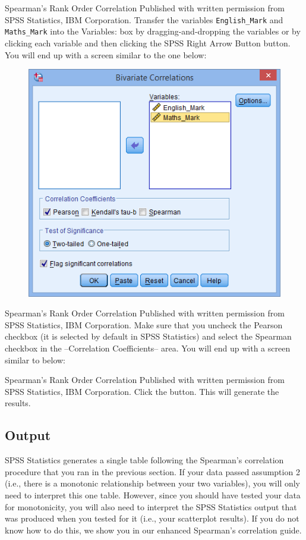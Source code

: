 \documentclass[]{article}
\begin{document}
Spearman's Rank Order Correlation
Published with written permission from SPSS Statistics, IBM Corporation.
Transfer the variables \texttt{English\_Mark} and \texttt{Maths\_Mark} into the Variables: box by dragging-and-dropping the variables or by clicking each variable and then clicking the SPSS Right Arrow Button button. You will end up with a screen similar to the one below:
\begin{figure}
	\centering
	\includegraphics[width=0.7\linewidth]{images/spearmans-rank-order-correlation-3}
	\caption{}
	\label{fig:spearmans-rank-order-correlation-3}
\end{figure}
Spearman's Rank Order Correlation
Published with written permission from SPSS Statistics, IBM Corporation.
Make sure that you uncheck the Pearson checkbox (it is selected by default in SPSS Statistics) and select the Spearman checkbox in the –Correlation Coefficients– area. You will end up with a screen similar to below:

Spearman's Rank Order Correlation
Published with written permission from SPSS Statistics, IBM Corporation.
Click the  button. This will generate the results.

\subsection{Output}
SPSS Statistics generates a single table following the Spearman’s correlation procedure that you ran in the previous section. If your data passed assumption 2 (i.e., there is a monotonic relationship between your two variables), you will only need to interpret this one table. However, since you should have tested your data for monotonicity, you will also need to interpret the SPSS Statistics output that was produced when you tested for it (i.e., your scatterplot results). If you do not know how to do this, we show you in our enhanced Spearman’s correlation guide. 
\end{document}

